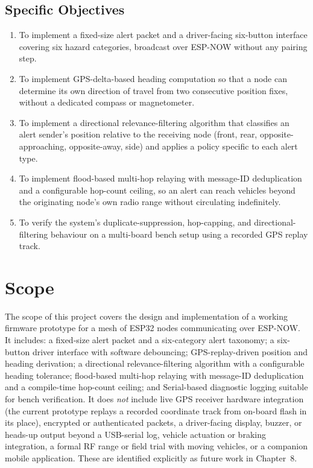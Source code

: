 \documentclass[12pt,a4paper]{report}
\begin{document}
\subsection{Specific Objectives}
\begin{enumerate}[leftmargin=1.8em]
\item To implement a fixed-size alert packet and a driver-facing six-button interface covering six hazard categories, broadcast over ESP-NOW without any pairing step.
\item To implement GPS-delta-based heading computation so that a node can determine its own direction of travel from two consecutive position fixes, without a dedicated compass or magnetometer.
\item To implement a directional relevance-filtering algorithm that classifies an alert sender's position relative to the receiving node (front, rear, opposite-approaching, opposite-away, side) and applies a policy specific to each alert type.
\item To implement flood-based multi-hop relaying with message-ID deduplication and a configurable hop-count ceiling, so an alert can reach vehicles beyond the originating node's own radio range without circulating indefinitely.
\item To verify the system's duplicate-suppression, hop-capping, and directional-filtering behaviour on a multi-board bench setup using a recorded GPS replay track.
\end{enumerate}

\section{Scope}
The scope of this project covers the design and implementation of a working firmware prototype for a mesh of ESP32 nodes communicating over ESP-NOW. It includes: a fixed-size alert packet and a six-category alert taxonomy; a six-button driver interface with software debouncing; GPS-replay-driven position and heading derivation; a directional relevance-filtering algorithm with a configurable heading tolerance; flood-based multi-hop relaying with message-ID deduplication and a compile-time hop-count ceiling; and Serial-based diagnostic logging suitable for bench verification. It does \emph{not} include live GPS receiver hardware integration (the current prototype replays a recorded coordinate track from on-board flash in its place), encrypted or authenticated packets, a driver-facing display, buzzer, or heads-up output beyond a USB-serial log, vehicle actuation or braking integration, a formal RF range or field trial with moving vehicles, or a companion mobile application. These are identified explicitly as future work in Chapter~8.
\end{document}
